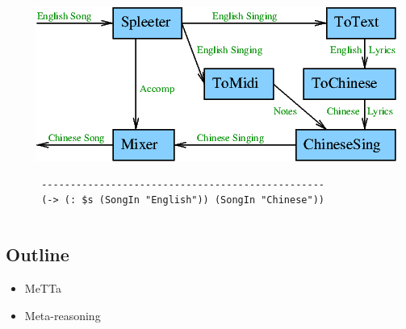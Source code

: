 \documentclass[aspectratio=169]{beamer}
\begin{document}
\begin{frame}[fragile]
\begin{columns}
\begin{column}{7cm}
    \end{column}

    \vrule

    \begin{column}{7cm}

      \includegraphics[scale=0.4]{pics/EnglishToChineseSong.png}

      \begin{lstlisting}
 -------------------------------------------------
 (-> (: $s (SongIn "English")) (SongIn "Chinese"))
      \end{lstlisting}

    \end{column}

  \end{columns}
\end{frame}

\subsection{Outline}

\begin{frame}





  \begin{itemize}
  \item MeTTa
  \item Meta-reasoning
  \end{itemize}
\end{frame}
\end{document}
